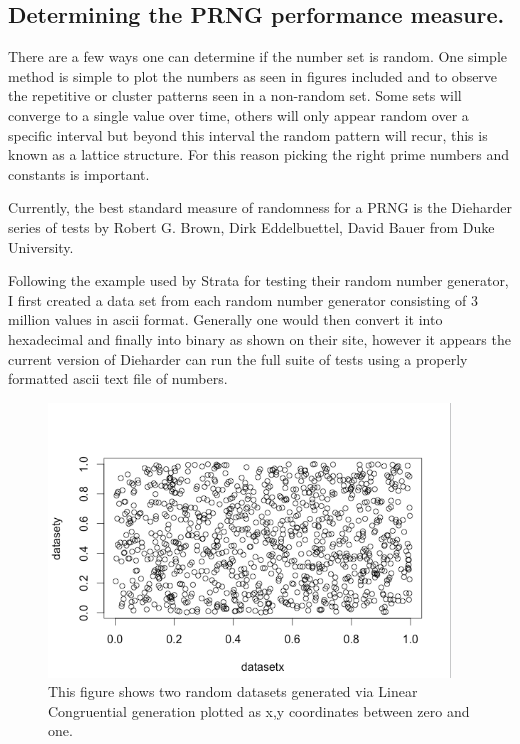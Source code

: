 \documentclass[a4paper]{article}
\begin{document}
\subsection{Determining the PRNG performance measure.}
\par There are a few ways one can determine if the number set is random.
One simple method is simple to plot the numbers as seen in figures included and to observe the repetitive or cluster patterns seen in a non-random set. Some sets will converge to a single value over time, others will only appear random over a specific interval but beyond this interval the random pattern will recur, this is known as a lattice structure. For this reason picking the right prime numbers and constants is important.\cite{stata2014}
\par Currently, the best standard measure of randomness for a PRNG is the Dieharder series of tests by Robert G. Brown, Dirk Eddelbuettel, David Bauer from Duke University.\cite{Brown2014}
\par Following the example used by Strata for testing their random number generator, I first created a data set from each random number generator consisting of 3 million values in ascii format. Generally one would then convert it into hexadecimal and finally into binary as shown on their site, however it appears the current version of Dieharder can run the full suite of tests using a properly formatted ascii text file of numbers.\cite{stata2014}



\begin{figure}
\centering
\includegraphics[width=0.95\textwidth]{plot.png}
\caption{\label{fig:plot}This figure shows two random datasets generated via Linear Congruential generation plotted as x,y coordinates between zero and one.}
\end{figure}
\end{document}
